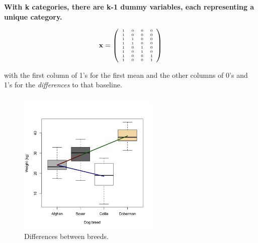 \documentclass{beamer}
\newenvironment{VerbatimIN}
 {\VerbatimEnvironment
  \begin{tcolorbox}[
    breakable,
    colback=lightgray,
    spartan
  ]%
  \begin{Verbatim}}
 {\end{Verbatim}\end{tcolorbox}}
\newenvironment{VerbatimOUT}
 {\VerbatimEnvironment
  \begin{tcolorbox}[
    breakable,
    spartan
  ]%
  \begin{Verbatim}}
 {\end{Verbatim}\end{tcolorbox}}
\begin{document}
\begin{frame}
  \frametitle{}
  \textbf{With k categories, there are k-1 dummy variables, each representing a unique category.}
  \vspace{0.5cm}
  
  \begin{equation*}
  \tiny {\mathbf{x} = \left( \begin{array}{cccc} 1 & 0 & 0 & 0 \\ 1 & 0 & 0 & 0 \\ 1 & 1 & 0 & 0 \\ 1 & 1 & 0 & 0 \\ 1 & 0 & 1 & 0 \\ 1 & 0 & 1 & 0 \\ 1 & 0 & 0 & 1\\ 1 & 0 & 0 & 1 \end{array}\right) }
  \end{equation*}
  \vspace{0.5cm}

  with the first column of 1's for the first mean and the other columns of 0's and 1's for the \textit{differences} to that baseline.
\end{frame}

\begin{frame}
  \frametitle{}
  \begin{figure}[h]
    \centering
    \includegraphics[width=0.6\textwidth]{lectures/day_3_LM_refresh_II/figures/unnamed-chunk-13-1.png} 
    \caption{Differences between breeds.}
  \end{figure}
\end{frame}

\end{document}
